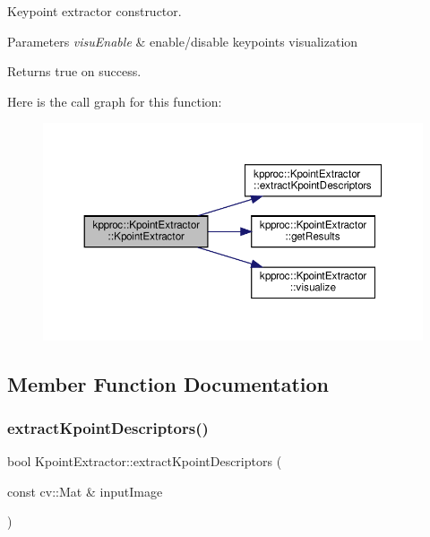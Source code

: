 Keypoint extractor constructor. 


\begin{DoxyParams}{Parameters}
{\em visu\+Enable} & enable/disable keypoints visualization\\
\hline
\end{DoxyParams}
\begin{DoxyReturn}{Returns}
true on success. 
\end{DoxyReturn}
Here is the call graph for this function\+:\nopagebreak
\begin{figure}[H]
\begin{center}
\leavevmode
\includegraphics[width=350pt]{classkpproc_1_1KpointExtractor_ad05a95e4da00ee5d14a4c1b99141cd08_cgraph}
\end{center}
\end{figure}


\subsection{Member Function Documentation}
\mbox{\label{classkpproc_1_1KpointExtractor_ade1efa4e540390775ed7158f57ca9618}} 
\subsubsection{\texorpdfstring{extract\+Kpoint\+Descriptors()}{extractKpointDescriptors()}}
{\footnotesize\ttfamily bool Kpoint\+Extractor\+::extract\+Kpoint\+Descriptors (\begin{DoxyParamCaption}\item[{const cv\+::\+Mat \&}]{input\+Image }\end{DoxyParamCaption})}



